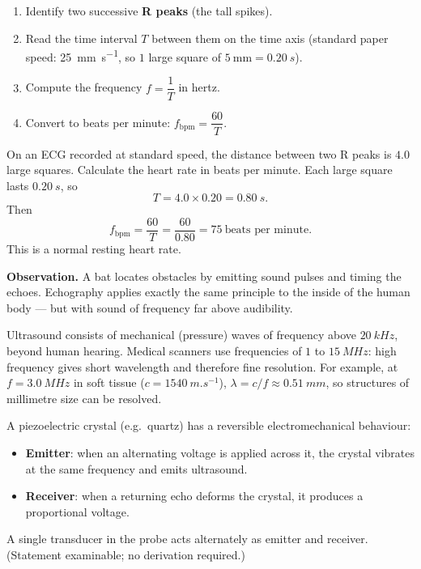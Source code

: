 \documentclass[11pt]{article}
\newcommand{\cle}[1]{{\popxbold\color{popdark}#1}}
\newcounter{popsec}
\newcounter{popsub}
\newcommand{\courssub}[1]{%
  \stepcounter{popsub}%
  \par\vspace{9pt}\noindent{\popxbold\fontsize{11.5}{13}\selectfont\color{popink}{\color{poporange}\thepopsec.\thepopsub}\hspace{6pt}#1}\par\nopagebreak\vspace{4pt}
}
\begin{document}
\begin{methode}
\begin{enumerate}
\item Identify two successive \textbf{R peaks} (the tall spikes).
\item Read the time interval $T$ between them on the time axis (standard paper speed: \SI{25}{mm.s^{-1}}, so $1$ large square of $5\ \mathrm{mm} = \SI{0.20}{s}$).
\item Compute the frequency $f = \dfrac{1}{T}$ in hertz.
\item Convert to beats per minute: $f_{\mathrm{bpm}} = \dfrac{60}{T}$.
\end{enumerate}
\end{methode}

\begin{exoresolu}
On an ECG recorded at standard speed, the distance between two R peaks is $4.0$ large squares. Calculate the heart rate in beats per minute.
\tcblower
Each large square lasts $\SI{0.20}{s}$, so
\[ T = 4.0 \times 0.20 = \SI{0.80}{s}. \]
Then
\[ f_{\mathrm{bpm}} = \frac{60}{T} = \frac{60}{0.80} = 75\ \text{beats per minute}. \]
This is a normal resting heart rate.
\end{exoresolu}

\courssub{Ultrasound Imaging (Echography)}

\textbf{Observation.} A bat locates obstacles by emitting sound pulses and timing the echoes. Echography applies exactly the same principle to the inside of the human body --- but with sound of frequency far above audibility.

\begin{definition}[Ultrasound]
\cle{Ultrasound} consists of mechanical (pressure) waves of frequency above $\SI{20}{kHz}$, beyond human hearing. Medical scanners use frequencies of $1$ to $\SI{15}{MHz}$: high frequency gives short wavelength and therefore fine resolution. For example, at $f = \SI{3.0}{MHz}$ in soft tissue ($c = \SI{1540}{m.s^{-1}}$), $\lambda = c/f \approx \SI{0.51}{mm}$, so structures of millimetre size can be resolved.
\end{definition}

\begin{propriete}
A \cle{piezoelectric} crystal (e.g.\ quartz) has a reversible electromechanical behaviour:
\begin{itemize}
\item \textbf{Emitter}: when an alternating voltage is applied across it, the crystal vibrates at the same frequency and emits ultrasound.
\item \textbf{Receiver}: when a returning echo deforms the crystal, it produces a proportional voltage.
\end{itemize}
A single \cle{transducer} in the probe acts alternately as emitter and receiver. (Statement examinable; no derivation required.)
\end{propriete}
\end{document}
